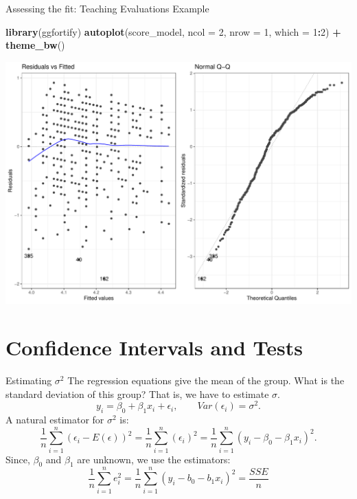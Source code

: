 \documentclass[
  ignorenonframetext,
]{beamer}
\newenvironment{Shaded}{\begin{snugshade}}{\end{snugshade}}
\newcommand{\AttributeTok}[1]{\textcolor[rgb]{0.13,0.29,0.53}{#1}}
\newcommand{\DecValTok}[1]{\textcolor[rgb]{0.00,0.00,0.81}{#1}}
\newcommand{\FunctionTok}[1]{\textcolor[rgb]{0.13,0.29,0.53}{\textbf{#1}}}
\newcommand{\NormalTok}[1]{#1}
\newcommand{\SpecialCharTok}[1]{\textcolor[rgb]{0.81,0.36,0.00}{\textbf{#1}}}
\begin{document}
\begin{frame}[fragile]{Assessing the fit: Teaching Evaluations Example}
\protect\hypertarget{assessing-the-fit-teaching-evaluations-example}{}
\normalsize

\begin{Shaded}
\begin{Highlighting}[]
\FunctionTok{library}\NormalTok{(ggfortify)}
\FunctionTok{autoplot}\NormalTok{(score\_model, }\AttributeTok{ncol =} \DecValTok{2}\NormalTok{, }\AttributeTok{nrow =} \DecValTok{1}\NormalTok{, }\AttributeTok{which =} \DecValTok{1}\SpecialCharTok{:}\DecValTok{2}\NormalTok{) }\SpecialCharTok{+}
  \FunctionTok{theme\_bw}\NormalTok{()}
\end{Highlighting}
\end{Shaded}

\begin{center}\includegraphics[width=0.8\linewidth,height=0.6\textheight]{Week4_Lect_files/figure-beamer/unnamed-chunk-26-1} \end{center}
\normalsize
\end{frame}

\hypertarget{confidence-intervals-and-tests}{%
\section{Confidence Intervals and
Tests}\label{confidence-intervals-and-tests}}

\begin{frame}{Estimating \(\sigma^2\)}
\protect\hypertarget{estimating-sigma2}{}
The regression equations give the mean of the group. What is the
standard deviation of this group? That is, we have to estimate
\(\sigma\).
\[ y_i=\beta_0+\beta_1x_i+\epsilon_i, \quad \quad Var(\epsilon_i)=\sigma^2.\]
A natural estimator for \(\sigma^2\) is:
\[\frac{1}{n}\sum_{i=1}^n(\epsilon_i-E(\epsilon))^2=\frac{1}{n}\sum_{i=1}^n(\epsilon_i)^2=\frac{1}{n}\sum_{i=1}^n(y_i-\beta_0-\beta_1x_i)^2.\]
Since, \(\beta_0\) and \(\beta_1\) are unknown, we use the estimators:
\[ \frac{1}{n}\sum_{i=1}^ne_i^2=\frac{1}{n}\sum_{i=1}^n(y_i-b_0-b_1x_i)^2=\frac{SSE}{n}\]
\end{frame}
\end{document}
